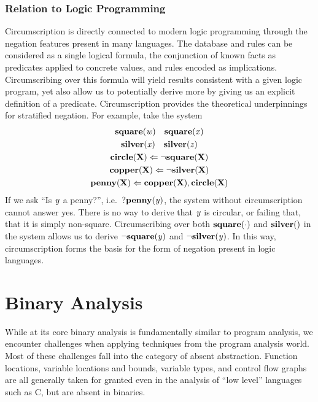 \subsubsection{Relation to Logic Programming}
Circumscription is directly connected to modern logic programming through the negation features present in many languages.
The database and rules can be considered as a single logical formula, the conjunction of known facts as predicates applied to concrete values, and rules encoded as implications.
Circumscribing over this formula will yield results consistent with a given logic program, yet also allow us to potentially derive more by giving us an explicit definition of a predicate.
Circumscription provides the theoretical underpinnings for stratified negation.
For example, take the system
\begin{gather*}
        {\bf square}({\it w}) \quad {\bf square}({\it x})\\
        {\bf silver}({\it x}) \quad {\bf silver}({\it z})\\
        {\bf circle}({\bf X}) \Leftarrow \neg {\bf square}({\bf X})\\
        {\bf copper}({\bf X}) \Leftarrow \neg {\bf silver}({\bf X})\\
        {\bf penny}({\bf X}) \Leftarrow {\bf copper}({\bf X}), {\bf circle}({\bf X})\\
\end{gather*}
If we ask ``Is ${\it y}$ a penny?'', i.e.\ $?{\bf penny}({\it y})$, the system without circumscription cannot answer yes.
There is no way to derive that ${\it y}$ is circular, or failing that, that it is simply non-square.
Circumscribing over both ${\bf square}(\cdot)$ and $\pred{silver}$ in the system allows us to derive $\neg {\bf square}({\it y})$ and $\neg {\bf silver}({\it y})$.
In this way, circumscription forms the basis for the form of negation present in logic languages.

\section{Binary Analysis}
While at its core binary analysis is fundamentally similar to program analysis, we encounter challenges when applying techniques from the program analysis world.
Most of these challenges fall into the category of absent abstraction.
Function locations, variable locations and bounds, variable types, and control flow graphs are all generally taken for granted even in the analysis of ``low level'' languages such as C, but are absent in binaries.

